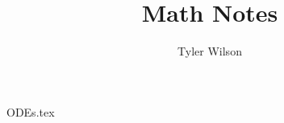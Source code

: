 \documentclass[11pt, fleqn]{article}
\title{Math Notes}
\author{Tyler Wilson}
\date{}
\begin{document}
\allowdisplaybreaks

\maketitle
\tableofcontents

{ODEs.tex}
\end{document}
